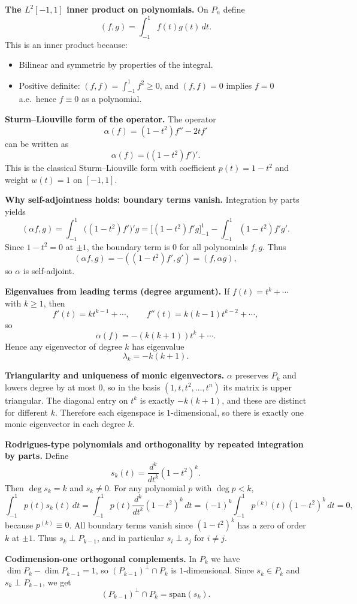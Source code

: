 \documentclass[12pt,a4paper]{article}
\theoremstyle{plain}
\theoremstyle{definition}      %
\begin{document}
\textbf{The $L^2[-1,1]$ inner product on polynomials.}
On $P_n$ define
\[
(f,g)=\int_{-1}^1 f(t)g(t)\,dt.
\]
This is an inner product because:
\begin{itemize}
	\item Bilinear and symmetric by properties of the integral.
	\item Positive definite: $(f,f)=\int_{-1}^1 f^2\ge 0$, and $(f,f)=0$ implies $f=0$ a.e.\ hence $f\equiv 0$ as a polynomial.
\end{itemize}

\textbf{Sturm--Liouville form of the operator.}
The operator
\[
\alpha(f)=(1-t^2)f''-2t f'
\]
can be written as
\[
\alpha(f)=\bigl((1-t^2)f'\bigr)'.
\]
This is the classical Sturm--Liouville form with coefficient $p(t)=1-t^2$ and weight $w(t)=1$ on $[-1,1]$.

\textbf{Why self-adjointness holds: boundary terms vanish.}
Integration by parts yields
\[
(\alpha f,g)=\int_{-1}^1 \bigl((1-t^2)f'\bigr)'g
=\Big[(1-t^2)f'g\Big]_{-1}^1-\int_{-1}^1(1-t^2)f'g'.
\]
Since $1-t^2=0$ at $\pm 1$, the boundary term is $0$ for all polynomials $f,g$.
Thus
\[
(\alpha f,g)=-( (1-t^2)f',g')= (f,\alpha g),
\]
so $\alpha$ is self-adjoint.

\textbf{Eigenvalues from leading terms (degree argument).}
If $f(t)=t^k+\cdots$ with $k\ge 1$, then
\[
f'(t)=k t^{k-1}+\cdots,\qquad f''(t)=k(k-1)t^{k-2}+\cdots,
\]
so
\[
\alpha(f)=-(k(k+1))t^k+\cdots.
\]
Hence any eigenvector of degree $k$ has eigenvalue
\[
\lambda_k=-k(k+1).
\]

\textbf{Triangularity and uniqueness of monic eigenvectors.}
$\alpha$ preserves $P_k$ and lowers degree by at most $0$, so in the basis $(1,t,t^2,\dots,t^n)$ its matrix is upper triangular.
The diagonal entry on $t^k$ is exactly $-k(k+1)$, and these are distinct for different $k$.
Therefore each eigenspace is $1$-dimensional, so there is exactly one monic eigenvector in each degree $k$.

\textbf{Rodrigues-type polynomials and orthogonality by repeated integration by parts.}
Define
\[
s_k(t)=\frac{d^k}{dt^k}(1-t^2)^k.
\]
Then $\deg s_k=k$ and $s_k\neq 0$.
For any polynomial $p$ with $\deg p<k$,
\[
\int_{-1}^1 p(t)s_k(t)\,dt
=\int_{-1}^1 p(t)\frac{d^k}{dt^k}(1-t^2)^k\,dt
=(-1)^k\int_{-1}^1 p^{(k)}(t)(1-t^2)^k\,dt=0,
\]
because $p^{(k)}\equiv 0$.
All boundary terms vanish since $(1-t^2)^k$ has a zero of order $k$ at $\pm 1$.
Thus $s_k\perp P_{k-1}$, and in particular $s_i\perp s_j$ for $i\neq j$.

\textbf{Codimension-one orthogonal complements.}
In $P_k$ we have $\dim P_k-\dim P_{k-1}=1$, so $(P_{k-1})^\perp\cap P_k$ is $1$-dimensional.
Since $s_k\in P_k$ and $s_k\perp P_{k-1}$, we get
\[
(P_{k-1})^\perp\cap P_k=\mathrm{span}(s_k).
\]
\end{document}
